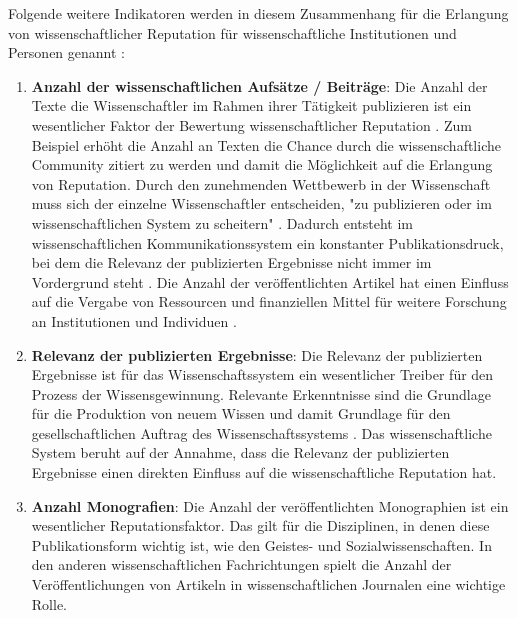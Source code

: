 \begin{enumerate}
\begin{end}
Folgende weitere Indikatoren werden in diesem Zusammenhang für die Erlangung von wissenschaftlicher Reputation für wissenschaftliche Institutionen und Personen genannt \cite{hanekop_2008}:
\begin{enumerate}
\item \textbf{Anzahl der wissenschaftlichen Aufsätze / Beiträge}: Die Anzahl der Texte die Wissenschaftler im Rahmen ihrer Tätigkeit publizieren ist ein wesentlicher Faktor der Bewertung wissenschaftlicher Reputation \cite{luhmann_1970_selbststeuerung} \cite{CLAPHAM_2005}. Zum Beispiel erhöht die Anzahl an Texten die Chance durch die wissenschaftliche Community zitiert zu werden und damit die Möglichkeit auf die Erlangung von Reputation. Durch den zunehmenden Wettbewerb in der Wissenschaft muss sich der einzelne Wissenschaftler entscheiden, "zu publizieren oder im wissenschaftlichen System zu scheitern" \cite{Suess_2006}. Dadurch entsteht im wissenschaftlichen Kommunikationssystem ein konstanter Publikationsdruck, bei dem die Relevanz der publizierten Ergebnisse nicht immer im Vordergrund steht \cite{hamilton_1990_publishing}. Die Anzahl der veröffentlichten Artikel hat einen Einfluss auf die Vergabe von Ressourcen und finanziellen Mittel für weitere Forschung an Institutionen und Individuen \cite{hamilton_1990_publishing}.
\item \textbf{Relevanz der publizierten Ergebnisse}: Die Relevanz der publizierten Ergebnisse ist für das Wissenschaftssystem ein wesentlicher Treiber für den Prozess der Wissensgewinnung. Relevante Erkenntnisse sind die Grundlage für die Produktion von neuem Wissen und damit Grundlage für den gesellschaftlichen Auftrag des Wissenschaftssystems \cite{suchen}. Das wissenschaftliche System beruht auf der Annahme, dass die Relevanz der publizierten Ergebnisse einen direkten Einfluss auf die wissenschaftliche Reputation hat.
\item \textbf{Anzahl Monografien}: Die Anzahl der veröffentlichten Monographien ist ein wesentlicher Reputationsfaktor. Das gilt für die Disziplinen, in denen diese Publikationsform wichtig ist, wie den Geistes- und Sozialwissenschaften. In den anderen wissenschaftlichen Fachrichtungen spielt die Anzahl der Veröffentlichungen von Artikeln in wissenschaftlichen Journalen eine wichtige Rolle.

\end{enumerate}
\end{end}
\end{enumerate}

